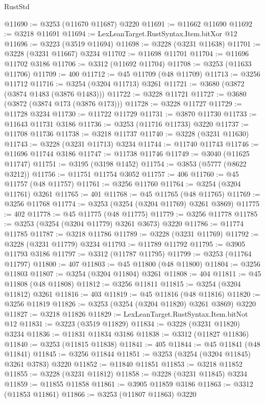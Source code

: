 \begin{lexlean}{RustStd}
\begin{coremodule}
{\begin{coremodule}
{{{{{{{{{{{{{{{{{{{{{{{{{{{{{{{{{{{{{@11690 := @3253 (@11670 @11687) @3220
@11691 := @11662 @11690
@11692 := @3218 @11691
@11694 := LexLeanTarget.RustSyntax.Item.bitXor @12
@11696 := @3223 (@3519 @11694)
@11698 := @3228 (@3231 @11638)
@11701 := @3228 (@3231 @11667) @3234
@11702 := @11698 @11701
@11704 := @11696 @11702 @3186
@11706 := @3312 (@11692 @11704)
@11708 := @3253 (@11633 @11706)
@11709 := 400
@11712 := @45 @11709 (@48 @11709)
@11713 := @3256 @11712
@11716 := @3254 (@3204 @11713) @3261
@11721 := @3680 (@3872 (@3874 @1483 (@3876 @1483)))
@11722 := @3228 @11721
@11727 := @3680 (@3872 (@3874 @173 (@3876 @173)))
@11728 := @3228 @11727
@11729 := @11728 @3234
@11730 := @11722 @11729
@11731 := @3870 @11730
@11733 := @11643 @11731 @3186
@11736 := @3253 (@11716 @11733) @3220
@11737 := @11708 @11736
@11738 := @3218 @11737
@11740 := @3228 (@3231 @11630)
@11743 := @3228 (@3231 @11713) @3234
@11744 := @11740 @11743
@11746 := @11696 @11744 @3186
@11747 := @11738 @11746
@11749 := @3040 (@11625 @11747)
@11751 := @3195 (@3198 @1452)
@11754 := @3853 (@5777 (@8622 @3212))
@11756 := @11751 @11754 @3052
@11757 := 406
@11760 := @45 @11757 (@48 @11757)
@11761 := @3256 @11760
@11764 := @3254 (@3204 @11761) @3261
@11765 := 401
@11768 := @45 @11765 (@48 @11765)
@11769 := @3256 @11768
@11774 := @3253 (@3254 (@3204 @11769) @3261 @3869)
@11775 := 402
@11778 := @45 @11775 (@48 @11775)
@11779 := @3256 @11778
@11785 := @3253 (@3254 (@3204 @11779) @3261 @3673) @3220
@11786 := @11774 @11785
@11787 := @3218 @11786
@11789 := @3228 (@3231 @11769)
@11792 := @3228 (@3231 @11779) @3234
@11793 := @11789 @11792
@11795 := @3905 @11793 @3186
@11797 := @3312 (@11787 @11795)
@11799 := @3253 (@11764 @11797)
@11800 := 407
@11803 := @45 @11800 (@48 @11800)
@11804 := @3256 @11803
@11807 := @3254 (@3204 @11804) @3261
@11808 := 404
@11811 := @45 @11808 (@48 @11808)
@11812 := @3256 @11811
@11815 := @3254 (@3204 @11812) @3261
@11816 := 403
@11819 := @45 @11816 (@48 @11816)
@11820 := @3256 @11819
@11826 := @3253 (@3254 (@3204 @11820) @3261 @3869) @3220
@11827 := @3218 @11826
@11829 := LexLeanTarget.RustSyntax.Item.bitNot @12
@11831 := @3223 (@3519 @11829)
@11834 := @3228 (@3231 @11820) @3234
@11836 := @11831 @11834 @3186
@11838 := @3312 (@11827 @11836)
@11840 := @3253 (@11815 @11838)
@11841 := 405
@11844 := @45 @11841 (@48 @11841)
@11845 := @3256 @11844
@11851 := @3253 (@3254 (@3204 @11845) @3261 @3783) @3220
@11852 := @11840 @11851
@11853 := @3218 @11852
@11855 := @3228 (@3231 @11812)
@11858 := @3228 (@3231 @11845) @3234
@11859 := @11855 @11858
@11861 := @3905 @11859 @3186
@11863 := @3312 (@11853 @11861)
@11866 := @3253 (@11807 @11863) @3220
}}}}}}}}}}}}}}}}}}}}}}}}}}}}}}}}}}}}}
\end{coremodule}}
\end{coremodule}
\end{lexlean}
